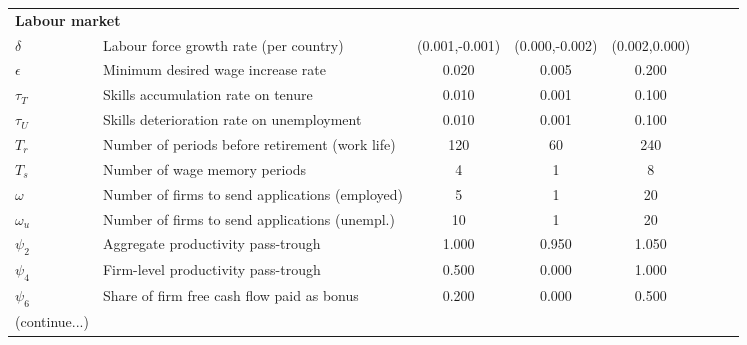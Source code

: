 \documentclass[a4paper,11pt]{article}
\begin{document}
\begin{appendices}
\begin{landscape}
\begin{table}[h]
\begin{tabular}{llcccccc}
\midrule
\multicolumn{2}{l}{\textbf{Labour market}} \\
$\delta$						& Labour force growth rate (per country)				& (0.001,-0.001)	& (0.000,-0.002)& (0.002,0.000)	& 					& 					& 	 \\
$\epsilon$						& Minimum desired wage increase rate					& 0.020				& 0.005			& 0.200			& 					& 					& 	 \\
$\tau_T$						& Skills accumulation rate on tenure					& 0.010				& 0.001			& 0.100			& 					& 					& 	 \\
$\tau_U$						& Skills deterioration rate on unemployment				& 0.010				& 0.001			& 0.100			& 					& 					& 	 \\
$T_r$ 							& Number of periods before retirement (work life)		& 120				& 60			& 240			& 					& 					& 	 \\
$T_s$ 							& Number of wage memory periods							& 4					& 1				& 8				& 					& 					& 	 \\
$\omega$						& Number of firms to send applications (employed)		& 5					& 1				& 20			& 					& 					& 	 \\
$\omega_u$						& Number of firms to send applications (unempl.)		& 10				& 1				& 20			& 					& 					& 	 \\
$\psi_2$ 						& Aggregate productivity pass-trough					& 1.000				& 0.950			& 1.050			& 					& 					& 	 \\
$\psi_4$ 						& Firm-level productivity pass-trough					& 0.500				& 0.000			& 1.000			& 					& 					& 	 \\
$\psi_6$						& Share of firm free cash flow paid as bonus			& 0.200				& 0.000			& 0.500			& 					& 					& 	 \\
\bottomrule
(continue...)
\end{tabular}
\end{table}


\end{landscape}
\end{appendices}
\end{document}
